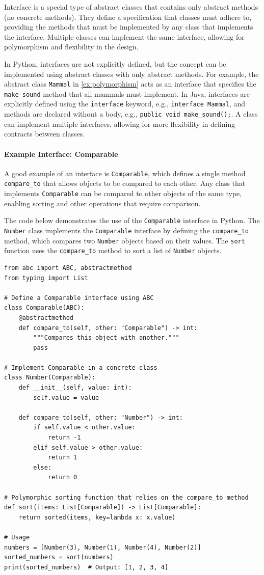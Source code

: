 \documentclass[oneside,11pt,dvipsnames]{book}
\newcommand{\code}[1]{\texttt{#1}}
\begin{document}
Interface is a special type of abstract classes that contains only abstract methods (no concrete methods). They define a specification that classes must adhere to, providing the methods that must be implemented by any class that implements the interface. Multiple classes can implement the same interface, allowing for polymorphism and flexibility in the design.

In Python, interfaces are not explicitly defined, but the concept can be implemented using abstract classes with only abstract methods. For example, the abstract class \code{Mammal} in \autoref{ex:polymorphism} acts as an interface that specifies the \code{make\_sound} method that all mammals must implement.
In Java, interfaces are explicitly defined using the \code{interface} keyword, e.g., \code{interface Mammal}, and methods are declared without a body, e.g., \code{public void make\_sound();}. A class can implement multiple interfaces, allowing for more flexibility in defining contracts between classes.


\paragraph{Example Interface: Comparable} A good example of an interface is \code{Comparable}, which defines a single method \code{compare\_to} that allows objects to be compared to each other. Any class that implements \code{Comparable} can be compared to other objects of the same type, enabling sorting and other operations that require comparison.

The code below demonstrates the use of the \code{Comparable} interface in Python. The \code{Number} class implements the \code{Comparable} interface by defining the \code{compare\_to} method, which compares two \code{Number} objects based on their values. The \code{sort} function uses the \code{compare\_to} method to sort a list of \code{Number} objects.

\begin{lstlisting}
from abc import ABC, abstractmethod
from typing import List

# Define a Comparable interface using ABC
class Comparable(ABC):
    @abstractmethod
    def compare_to(self, other: "Comparable") -> int:
        """Compares this object with another."""
        pass

# Implement Comparable in a concrete class
class Number(Comparable):
    def __init__(self, value: int):
        self.value = value

    def compare_to(self, other: "Number") -> int:
        if self.value < other.value:
            return -1
        elif self.value > other.value:
            return 1
        else:
            return 0

# Polymorphic sorting function that relies on the compare_to method
def sort(items: List[Comparable]) -> List[Comparable]:
    return sorted(items, key=lambda x: x.value)

# Usage
numbers = [Number(3), Number(1), Number(4), Number(2)]
sorted_numbers = sort(numbers)
print(sorted_numbers)  # Output: [1, 2, 3, 4]
\end{lstlisting}    
\end{document}
